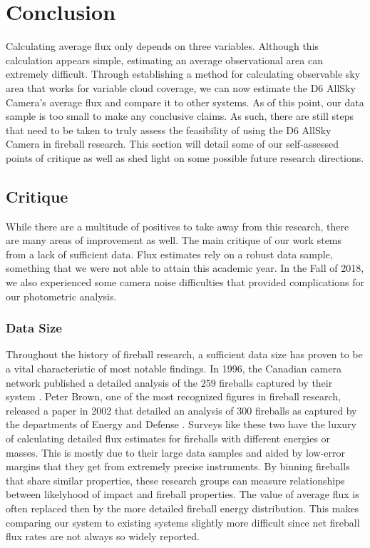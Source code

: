 
\chapter{Conclusion}

Calculating average flux only depends on three variables. 
Although this calculation appears simple, estimating an average observational area can extremely difficult. 
Through establishing a method for calculating observable sky area that works for variable cloud coverage, we can now estimate the D6 AllSky Camera's average flux and compare it to other systems.
As of this point, our data sample is too small to make any conclusive claims.  
As such, there are still steps that need to be taken to truly assess the feasibility of using the D6 AllSky Camera in fireball research.
This section will detail some of our self-assessed points of critique as well as shed light on some possible future research directions.


\section{Critique}

While there are a multitude of positives to take away from this research, there are many areas of improvement as well.  
The main critique of our work stems from a lack of sufficient data.
Flux estimates rely on a robust data sample, something that we were not able to attain this academic year. 
In the Fall of 2018, we also experienced some camera noise difficulties that provided complications for our photometric analysis.


\subsection{Data Size}

Throughout the history of fireball research, a sufficient data size has proven to be a vital characteristic of most notable findings.
In 1996, the Canadian camera network published a detailed analysis of the $259$ fireballs captured by their system \cite{halliday_innisfree_1981}.
Peter Brown, one of the most recognized figures in fireball research, released a paper in 2002 that detailed an analysis of $300$ fireballs as captured by the departments of Energy and Defense \cite{brown_p_flux_2002}.
Surveys like these two have the luxury of calculating detailed flux estimates for fireballs with different energies or masses.
This is mostly due to their large data samples and aided by low-error margins that they get from extremely precise instruments.
By binning fireballs that share similar properties, these research groups can measure relationships between likelyhood of impact and fireball properties.
The value of average flux is often replaced then by the more detailed fireball energy distribution.
This makes comparing our system to existing systems slightly more difficult since net fireball flux rates are not always so widely reported.


